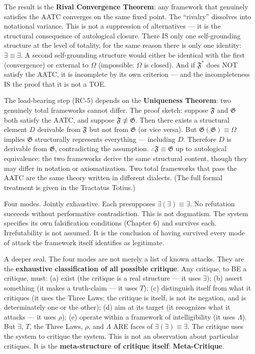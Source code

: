 \documentclass[10pt, openany, oneside]{book}
\begin{document}
\vspace{0.5em}

\noindent The result is the \textbf{Rival Convergence Theorem}: any framework that genuinely satisfies the AATC converges on the same fixed point. The ``rivalry'' dissolves into notational variance. This is not a suppression of alternatives --- it is the structural consequence of autological closure. There IS only one self-grounding structure at the level of totality, for the same reason there is only one identity: $\exists \equiv \exists$. A second self-grounding structure would either be identical with the first (convergence) or external to $\Omega$ (impossible: $\Omega$ is closed). And if $\mathfrak{F}^*$ does NOT satisfy the AATC, it is incomplete by its own criterion --- and the incompleteness IS the proof that it is not a TOE.

The load-bearing step (RC-5) depends on the \textbf{Uniqueness Theorem}: two genuinely total frameworks cannot differ. The proof sketch: suppose $\mathfrak{F}$ and $\mathfrak{G}$ both satisfy the AATC, and suppose $\mathfrak{F} \not\equiv \mathfrak{G}$. Then there exists a structural element $D$ derivable from $\mathfrak{F}$ but not from $\mathfrak{G}$ (or vice versa). But $\mathfrak{G}(\mathfrak{G}) \equiv \Omega$ implies $\mathfrak{G}$ structurally represents everything --- including $D$. Therefore $D$ is derivable from $\mathfrak{G}$, contradicting the assumption. $\therefore \mathfrak{F} \equiv \mathfrak{G}$ up to autological equivalence: the two frameworks derive the same structural content, though they may differ in notation or axiomatization. Two total frameworks that pass the AATC are the same theory written in different dialects. (The full formal treatment is given in the Tractatus Totius.)

Four modes. Jointly exhaustive. Each presupposes $\exists(\exists) \equiv \exists$. No refutation succeeds without performative contradiction. This is not dogmatism. The system specifies its own falsification conditions (Chapter 6) and survives each. Irrefutability is not assumed. It is the conclusion of having survived every mode of attack the framework itself identifies as legitimate.

A deeper seal. The four modes are not merely a list of known attacks. They are the \textbf{exhaustive classification of all possible critique}. Any critique, to BE a critique, must: (a) exist (the critique is a real structure --- it uses $\exists$); (b) assert something (it makes a truth-claim --- it uses $T$); (c) distinguish itself from what it critiques (it uses the Three Laws: the critique is itself, is not its negation, and is determinately one or the other); (d) aim at its target (it recognizes what it attacks --- it uses $\rho$); (e) operate within a framework of intelligibility (it uses $\Lambda$). But $\exists$, $T$, the Three Laws, $\rho$, and $\Lambda$ ARE faces of $\exists(\exists) \equiv \exists$. The critique uses the system to critique the system. This is not an observation about particular critiques. It is the \textbf{meta-structure of critique itself}: \textbf{Meta-Critique}.
\end{document}
